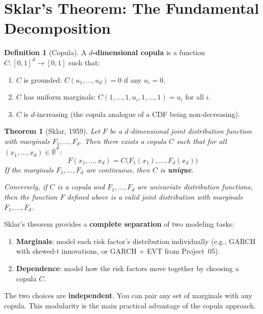 \documentclass[11pt, a4paper]{article}
\theoremstyle{definition}
\newtheorem{definition}{Definition}[section]
\theoremstyle{plain}
\newtheorem{theorem}{Theorem}[section]
\theoremstyle{remark}
\newcommand{\RV}{\mathbb{R}}
\begin{document}
\section{Sklar's Theorem: The Fundamental Decomposition}
\label{sec:sklar}

\begin{definition}[Copula]
A \textbf{$d$-dimensional copula} is a function $C : [0,1]^d \to [0,1]$ such that:
\begin{enumerate}
    \item $C$ is grounded: $C(u_1, \ldots, u_d) = 0$ if any $u_i = 0$.
    \item $C$ has uniform marginals: $C(1, \ldots, 1, u_i, 1, \ldots, 1) = u_i$ for all $i$.
    \item $C$ is $d$-increasing (the copula analogue of a CDF being non-decreasing).
\end{enumerate}
\end{definition}

\begin{theorem}[Sklar, 1959]\label{thm:sklar}
Let $F$ be a $d$-dimensional joint distribution function with marginals $F_1, \ldots, F_d$.
Then there exists a copula $C$ such that for all $(x_1, \ldots, x_d) \in \overline{\RV}^d$:
\[
    F(x_1, \ldots, x_d) = C\bigl(F_1(x_1), \ldots, F_d(x_d)\bigr)
\]
If the marginals $F_1, \ldots, F_d$ are continuous, then $C$ is \textbf{unique}.

Conversely, if $C$ is a copula and $F_1, \ldots, F_d$ are univariate distribution functions,
then the function $F$ defined above is a valid joint distribution with marginals $F_1, \ldots, F_d$.
\end{theorem}

\begin{keyresult}
Sklar's theorem provides a \textbf{complete separation} of two modeling tasks:
\begin{enumerate}
    \item \textbf{Marginals}: model each risk factor's distribution individually
          (e.g., GARCH with skewed-$t$ innovations, or GARCH + EVT from Project~05).
    \item \textbf{Dependence}: model how the risk factors move together by choosing a copula $C$.
\end{enumerate}
The two choices are \textbf{independent}.
You can pair any set of marginals with any copula.
This modularity is the main practical advantage of the copula approach.
\end{keyresult}
\end{document}
